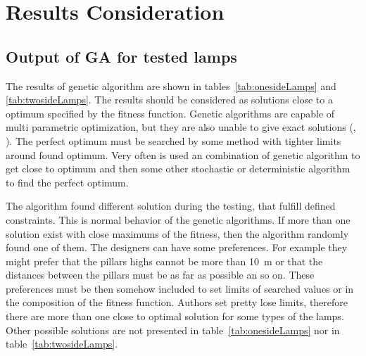 \section{Results Consideration}
\label{sec:Results}
\subsection{Output of GA for tested lamps}

The results of genetic algorithm are shown in tables~\ref{tab:onesideLamps} and \ref{tab:twosideLamps}. The results should be considered as solutions close to a optimum specified by the fitness function. Genetic algorithms are capable of multi parametric optimization, but they are also unable to give exact solutions (\cite{Zelinka2009}, \cite{Fogel2006}). The perfect optimum must be searched by some method with tighter limits around found optimum. Very often is used an combination of genetic algorithm to get close to optimum and then some other stochastic or deterministic algorithm to find the perfect optimum.

The algorithm found different solution during the testing, that fulfill defined constraints. This is normal behavior of the genetic algorithms. If more than one solution exist with close maximums of the fitness, then the algorithm randomly found one of them. The designers can have some preferences. For example they might prefer that the pillars highs cannot be more than 10~m or that the distances between the pillars must be as far as possible an so on. These preferences must be then somehow included to set limits of searched values or in the composition of the fitness function. Authors set pretty lose limits, therefore there are more than one close to optimal solution for some types of the lamps. Other possible solutions are not presented in table~\ref{tab:onesideLamps} nor in table~\ref{tab:twosideLamps}.
 
